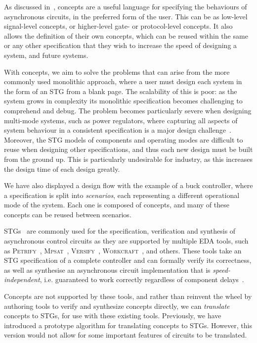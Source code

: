 \documentclass[british, journal]{IEEEtran}
\newcommand{\noun}[1]{\textsc{#1}}
\begin{document}
As discussed in~\cite{2015_Beaumont_MEMOCODE}, concepts are a useful language for specifying
the behaviours of asynchronous circuits, in the preferred form of the user. This can be as low-level 
signal-level concepts, or higher-level gate- or protocol-level concepts. It also allows the definition of 
their own concepts, which can be reused within the same or any other specification that they wish
to increase the speed of designing a system, and future systems. 

With concepts, we aim to solve the problems that can arise from the more commonly used
monolithic approach, where a user must design each system in the form of an STG from a blank page. 
The scalability of this is poor: as the system grows in complexity its monolithic specification becomes 
challenging to comprehend and debug. The problem becomes particularly severe when designing 
multi-mode systems, such as power regulators, where capturing all aspects of system behaviour in a
consistent specification is a major design challenge~\cite{2014_sokolov_ftfc}\cite{sokolov2015design}. 
Moreover, the STG models of components and  operating modes are difficult to reuse when designing 
other specifications, and thus each new design must be built from the ground up. This is particularly 
undesirable for industry, as this increases the design time of each design greatly. 

We have also displayed a design flow with the example of a buck controller, where a specification is 
split into \textit{scenarios}, each representing a different operational mode of the system. 
Each one is composed of concepts, and many of these concepts can be reused between 
scenarios.

STGs~\cite{Chu_1987_phd}\cite{Rosenblum_1985_tpn}
are commonly used for the specification,
verification and synthesis of asynchronous control circuits as they are
supported by multiple EDA tools, such as \noun{Petrify}~\cite{Cortadella},
\noun{Mpsat}~\cite{khomenko2004detecting}, \noun{Versify}~\cite{i1997formal},
\noun{Workcraft}~\cite{2007_poliakov_workcraft}\cite{Workcraft_website}, and
others.
These tools take an STG specification of a complete controller and can
formally verify its correctness, as well as synthesise an asynchronous
circuit implementation that is \emph{speed-independent}, i.e. guaranteed
to work correctly regardless of component delays~\cite{Muller_1959_ts}.

Concepts are not supported by these tools, and rather than reinvent the wheel by authoring tools
to verify and synthesize concepts directly, we can \emph{translate} concepts to STGs, for use with 
these existing tools. Previously, we have introduced a prototype algorithm for translating concepts
to STGs. However, this version would not allow for some important features of circuits to be
translated. 
\end{document}
